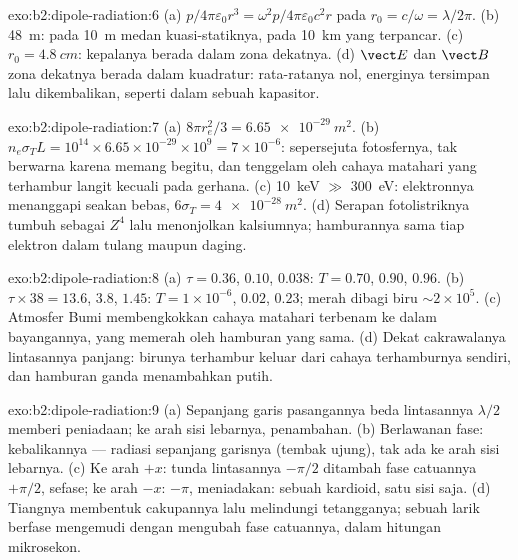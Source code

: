 \begin{solution}{exo:b2:dipole-radiation:6}
(a) $p/4\pi\varepsilon_0r^3 = \omega^2p/4\pi\varepsilon_0c^2r$ pada $r_0 = c/\omega = \lambda/2\pi$. (b) \qty{48}{m}:
pada \qty{10}{m} medan kuasi-statiknya, pada \qty{10}{km} yang terpancar. (c)
$r_0 = \qty{4.8}{cm}$: kepalanya berada dalam zona dekatnya. (d) $\vect E$
dan $\vect B$ zona dekatnya berada dalam kuadratur:  rata-ratanya nol,
energinya tersimpan lalu dikembalikan, seperti dalam sebuah kapasitor.
\end{solution}

\begin{solution}{exo:b2:dipole-radiation:7}
(a) $8\pi r_e^2/3 = \qty{6.65e-29}{m^2}$. (b) $n_e\sigma_TL = 10^{14} \times 6.65 \times 10^{-29}
\times 10^9 = 7 \times 10^{-6}$: sepersejuta fotosfernya, tak berwarna karena
 memang begitu, dan tenggelam oleh cahaya matahari yang terhambur langit
kecuali pada gerhana. (c) \qty{10}{keV} $\gg$ \qty{300}{eV}: elektronnya menanggapi seakan
bebas, $6\sigma_T = \qty{4e-28}{m^2}$. (d) Serapan fotolistriknya tumbuh sebagai $Z^4$
lalu menonjolkan kalsiumnya; hamburannya sama tiap elektron dalam tulang
maupun daging.
\end{solution}

\begin{solution}{exo:b2:dipole-radiation:8}
(a) $\tau = 0.36$, $0.10$, $0.038$: $T = 0.70$, $0.90$, $0.96$. (b) $\tau \times 38 = 13.6$,
$3.8$, $1.45$: $T = 1 \times 10^{-6}$, $0.02$, $0.23$; merah dibagi biru $\sim 2 \times 10^5$. (c)
Atmosfer Bumi membengkokkan cahaya matahari terbenam ke dalam bayangannya, yang memerah
oleh hamburan yang sama. (d) Dekat cakrawalanya lintasannya panjang: birunya
terhambur keluar dari cahaya terhamburnya sendiri, dan hamburan ganda
menambahkan putih.
\end{solution}

\begin{solution}{exo:b2:dipole-radiation:9}
(a) Sepanjang garis pasangannya beda lintasannya $\lambda/2$ memberi
peniadaan; ke arah sisi lebarnya, penambahan. (b) Berlawanan fase: kebalikannya ---
radiasi sepanjang garisnya (tembak ujung), tak ada ke arah sisi lebarnya. (c) Ke arah $+x$:
tunda lintasannya $-\pi/2$ ditambah fase catuannya $+\pi/2$, sefase; ke arah $-x$:
$-\pi$, meniadakan: sebuah kardioid, satu sisi saja. (d) Tiangnya membentuk cakupannya
lalu melindungi tetangganya; sebuah larik berfase mengemudi dengan mengubah fase
catuannya, dalam hitungan mikrosekon.
\end{solution}

